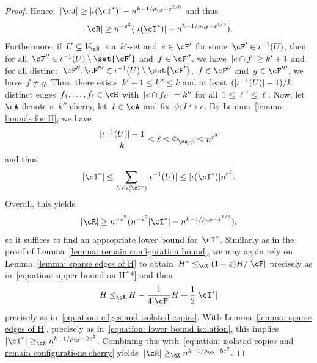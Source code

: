 \documentclass[11pt]{amsart}
\newcommand{\eps}{\varepsilon}
\DeclarePairedDelimiter{\abs}{\lvert}{\rvert}
\newcommand{\Xleq}{\leq_{\cX}}
\newcommand{\Xgeq}{\geq_{\cX}}
\newcommand{\injection}{\hookrightarrow}
\theoremstyle{definition}
\numberwithin{equation}{section}
\begin{document}
\begin{proof}
		Hence,~$\abs{\cJ}\geq \abs{\iota(\cI^*)}-n^{k-1/\rho_\cF-\eps^{1/6}}$ and thus
		\begin{equation*}
			\abs{\cR}\geq n^{-\eps^{2}}(\abs{\iota(\cI^*)}-n^{k-1/\rho_\cF-\eps^{1/6}}).
		\end{equation*}
		Furthermore, if~$U\subseteq V_\cH$ is a~$k'$-set and~$e\in\cF'$ for some~$\cF'\in \iota^{-1}(U)$, then for all~$\cF''\in \iota^{-1}(U)\setminus\set{\cF'}$ and~$f\in\cF''$, we have~$\abs{e\cap f}\geq k'+1$ and for all distinct~$\cF'',\cF'''\in \iota^{-1}(U)\setminus\set{\cF'}$,~$f\in\cF''$ and~$g\in\cF'''$, we have~$f\neq g$.
		Thus, there exists~$k'+1\leq k''\leq k$ and at least~$(\abs{\iota^{-1}(U)}-1)/k$ distinct edges~$f_1,\ldots,f_\ell\in\cH$ with~$\abs{e\cap f_{\ell'}}=k''$ for all~$1\leq \ell'\leq\ell$.
		Now, let~$\cA$ denote a~$k''$-cherry, let~$I\in\cA$ and fix~$\psi\colon I\injection e$.
		By Lemma~\ref{lemma: bounds for H}, we have
		\begin{equation*}
			\frac{\abs{\iota^{-1}(U)}-1}{k}
			\leq\ell
			\leq \Phi_{\cA,\psi}
			\leq n^{\eps^{3}}
		\end{equation*}
		and thus
		\begin{equation*}
			\abs{\cI^*}\leq \sum_{U\in\iota(\cI^*)}\abs{\iota^{-1}(U)}\leq \abs{\iota(\cI^*)}n^{\eps^{2}}.
		\end{equation*}
		Overall, this yields
		\begin{equation}\label{equation: isolated copies and remain configurations cherry}
			\abs{\cR}\geq n^{-\eps^{2}}(n^{-\eps^{2}}\abs{\cI^*}-n^{k-1/\rho_\cF-\eps^{1/6}}),
		\end{equation}
		so it suffices to find an appropriate lower bound for~$\cI^*$.
		Similarly as in the proof of Lemma~\ref{lemma: remain configuration bound}, we may again rely on Lemma~\ref{lemma: sparse edges of H} to obtain~$H^*\Xleq (1+\eps)H/\abs{\cF}$ precisely as in~\eqref{equation: upper bound on H^*} and then
		\begin{equation*}
			H\Xleq H-\frac{1}{4\abs{\cF}}H+\frac{1}{2}\abs{\cI^*}
		\end{equation*}
		precisely as in~\eqref{equation: edges and isolated copies}.
		With Lemma~\ref{lemma: sparse edges of H}, precisely as in~\eqref{equation: lower bound isolation}, this implies~$\abs{\cI^*}\Xgeq n^{k-1/\rho_\cF-2\eps^2}$. 
		Combining this with~\eqref{equation: isolated copies and remain configurations cherry} yields~$\abs{\cR}\Xgeq n^{k-1/\rho_\cF-5\eps^2}$.
	\end{proof}
	
\end{document}
